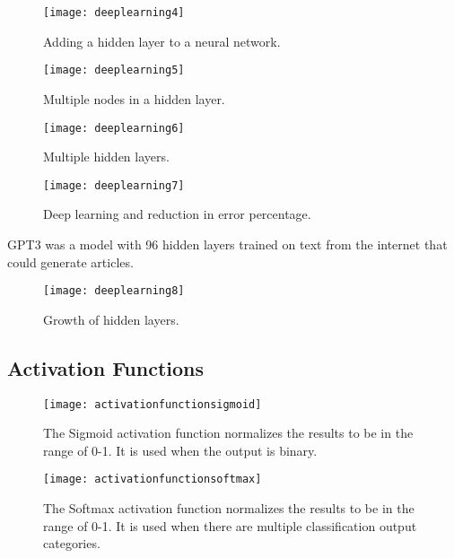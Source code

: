  	\begin{figure}[htb]
		\centering
		\texttt{[image: deeplearning4]}
		\caption[Adding a hidden layer to a neural network]{Adding a hidden layer to a neural network.}
		\label{fig:deeplearning4}
	\end{figure}

 	\begin{figure}[htb]
		\centering
		\texttt{[image: deeplearning5]}
		\caption[Multiple nodes in a hidden layer]{Multiple nodes in a hidden layer.}
		\label{fig:deeplearning5}
	\end{figure}

 	\begin{figure}[htb]
		\centering
		\texttt{[image: deeplearning6]}
		\caption[Multiple hidden layers]{Multiple hidden layers.}
		\label{fig:deeplearning6}
	\end{figure}

 	\begin{figure}[htb]
		\centering
		\texttt{[image: deeplearning7]}
		\caption[Deep learning and reduction in error percentage]{Deep learning and reduction in error percentage.}
		\label{fig:deeplearning7}
	\end{figure}

GPT3 was a model with 96 hidden layers trained on text from the internet that could generate articles.

 	\begin{figure}[htb]
		\centering
		\texttt{[image: deeplearning8]}
		\caption[Growth of hidden layers]{Growth of hidden layers.}
		\label{fig:deeplearning8}
	\end{figure}


	\subsection{Activation Functions}

 	\begin{figure}[htb]
		\centering
		\texttt{[image: activationfunctionsigmoid]}
		\caption[The Sigmoid activation function]{The Sigmoid activation function normalizes the results to be in the range of 0-1.  It is used when the output is binary.}
		\label{fig:activationfunctionsigmoid}
	\end{figure}

 	\begin{figure}[htb]
		\centering
		\texttt{[image: activationfunctionsoftmax]}
		\caption[The Softmax activation function]{The Softmax activation function normalizes the results to be in the range of 0-1.  It is used when there are multiple classification output categories.}
		\label{fig:activationfunctionsoftmax}
	\end{figure}

